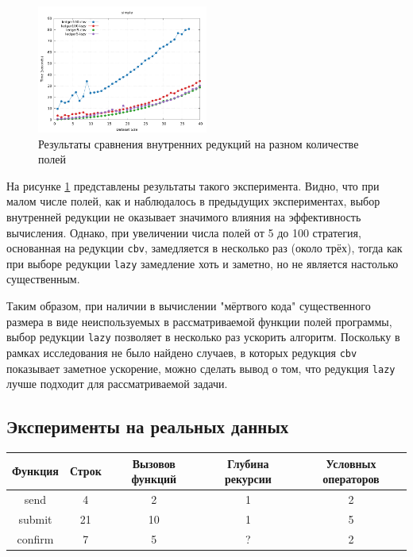 \documentclass[../thesis.tex]{subfiles}
\begin{document}
\begin{figure}
    \centering
    \includegraphics[width=0.5\textwidth]{ledger_size.png} 
    \caption{Результаты сравнения внутренних редукций на разном количестве полей}
    \label{ledger_size}
\end{figure}
На рисунке \ref{ledger_size} представлены результаты такого эксперимента. Видно, что при малом числе полей, как и наблюдалось в предыдущих экспериментах, выбор внутренней редукции не оказывает значимого влияния на эффективность вычисления. Однако, при увеличении числа полей от 5 до 100 стратегия, основанная на редукции \texttt{cbv}, замедляется в несколько раз (около трёх), тогда как при выборе редукции \texttt{lazy} замедление хоть и заметно, но не является настолько существенным. 

Таким образом, при наличии в вычислении "мёртвого кода" существенного размера в виде неиспользуемых в рассматриваемой функции полей программы, выбор редукции \texttt{lazy} позволяет в несколько раз ускорить алгоритм. Поскольку в рамках исследования не было найдено случаев, в которых редукция \texttt{cbv} показывает заметное ускорение, можно сделать вывод о том, что редукция \texttt{lazy} лучше подходит для рассматриваемой задачи. 

\subsection{Эксперименты на реальных данных}

\begin{table}[h]
\centering
\begin{tabular}{|c|c|c|c|c|}
\hline
Функция & Строк & Вызовов функций & Глубина рекурсии & Условных операторов \\
\hline
send & 4 & 2 & 1 & 2 \\
\hline
submit & 21 & 10 & 1 & 5\\
\hline
confirm & 7 & 5 & ? & 2 \\
\hline
\end{tabular}
\end{table}
\end{document}
